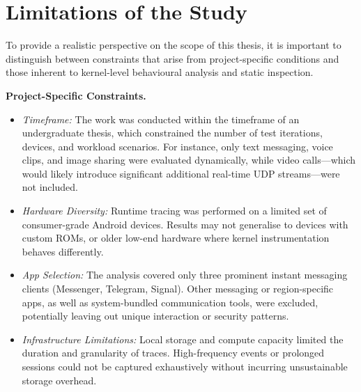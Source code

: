 \documentclass[a4paper,12pt]{report}
\begin{document}
\vspace{0.5em}
\noindent{}

\vspace{0.5em}
\noindent{}

\section{Limitations of the Study}

To provide a realistic perspective on the scope of this thesis, it is important to distinguish between constraints that arise from project-specific conditions and those inherent to kernel-level behavioural analysis and static inspection.

\vspace{0.3cm}

\textbf{Project-Specific Constraints.}

\begin{itemize}
\item \textit{Timeframe:} The work was conducted within the timeframe of an undergraduate thesis, which constrained the number of test iterations, devices, and workload scenarios. For instance, only text messaging, voice clips, and image sharing were evaluated dynamically, while video calls—which would likely introduce significant additional real-time UDP streams—were not included.
\item \textit{Hardware Diversity:} Runtime tracing was performed on a limited set of consumer-grade Android devices. Results may not generalise to devices with custom ROMs, or older low-end hardware where kernel instrumentation behaves differently.
\item \textit{App Selection:} The analysis covered only three prominent instant messaging clients (Messenger, Telegram, Signal). Other messaging or region-specific apps, as well as system-bundled communication tools, were excluded, potentially leaving out unique interaction or security patterns.
\item \textit{Infrastructure Limitations:} Local storage and compute capacity limited the duration and granularity of traces. High-frequency events or prolonged sessions could not be captured exhaustively without incurring unsustainable storage overhead.
\end{itemize}
\end{document}
